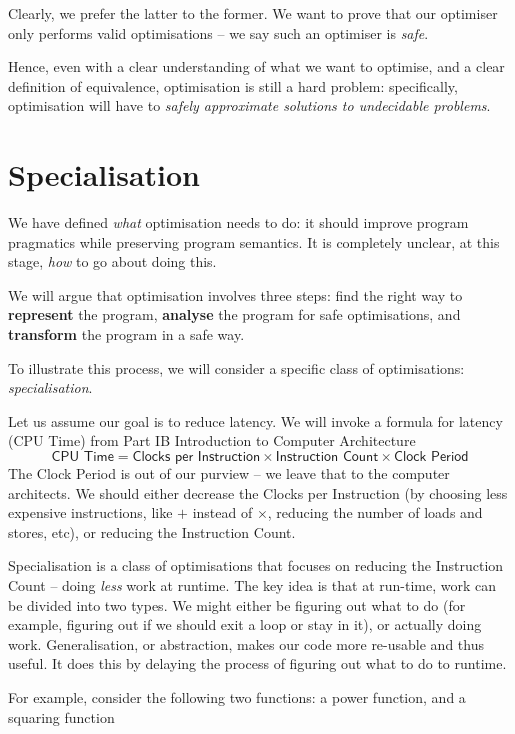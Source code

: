 Clearly, we prefer the latter to the former. We want to prove that our optimiser only performs valid optimisations -- we say such an optimiser is \textit{safe}. 

Hence, even with a clear understanding of what we want to optimise, and a clear definition of equivalence, optimisation is still a hard problem: specifically, optimisation will have to \textit{safely approximate solutions to undecidable problems}.  

\section{Specialisation}
We have defined \textit{what} optimisation needs to do: it should improve program pragmatics while preserving program semantics. It is completely unclear, at this stage, \textit{how} to go about doing this. 

We will argue that optimisation involves three steps: find the right way to \textbf{represent} the program, \textbf{analyse} the program for safe optimisations, and \textbf{transform} the program in a safe way. 

To illustrate this process, we will consider a specific class of optimisations: \textit{specialisation}. 

Let us assume our goal is to reduce latency. We will invoke a formula for latency (CPU Time) from \textsf{Part IB Introduction to Computer Architecture}
\[\textsf{CPU Time} = \textsf{Clocks per Instruction} \times \textsf{Instruction Count} \times \textsf{Clock Period}\]
The \textsf{Clock Period} is out of our purview -- we leave that to the computer architects. We should either decrease the \textsf{Clocks per Instruction} (by choosing less expensive instructions, like $+$ instead of $\times$, reducing the number of loads and stores, etc), or reducing the \textsf{Instruction Count}.  

Specialisation is a class of optimisations that focuses on reducing the \textsf{Instruction Count} -- doing \textit{less} work at runtime. The key idea is that at run-time, work can be divided into two types. We might either be figuring out what to do (for example, figuring out if we should exit a loop or stay in it), or actually doing work.  Generalisation, or abstraction, makes our code more re-usable and thus useful. It does this by delaying the process of figuring out what to do to runtime. 

For example, consider the following two functions: a power function, and a squaring function

